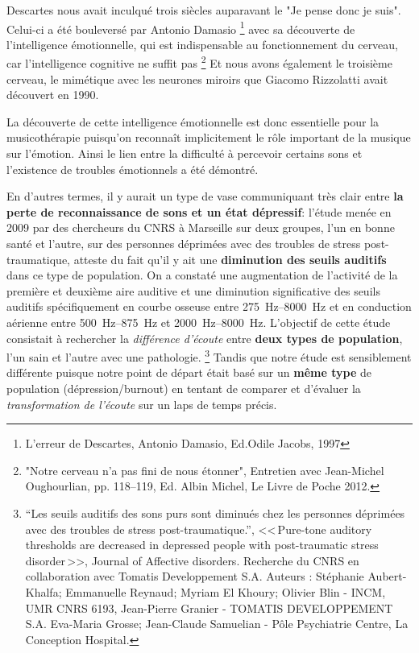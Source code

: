 Descartes nous avait inculqué trois siècles auparavant le "Je pense donc je suis". Celui-ci  a 
été bouleversé par Antonio Damasio \footnote {{L'erreur de Descartes}, Antonio Damasio, 
Ed.Odile Jacobs, 1997} 
avec sa découverte de l'intelligence émotionnelle, qui est indispensable au fonctionnement 
du 
cerveau, car  l'intelligence cognitive ne suffit pas%
\footnote{"Notre cerveau n'a pas fini de nous étonner", Entretien avec Jean-Michel 
     Oughourlian, pp. 118--119, Ed. Albin Michel, Le Livre de Poche 2012.}
Et nous avons  également le troisième cerveau, le mimétique avec les neurones miroirs que Giacomo Rizzolatti avait découvert en 1990.
 
La découverte de cette intelligence  émotionnelle est donc essentielle  pour la 
musicothérapie puisqu'on reconnaît implicitement le rôle important de la musique sur 
l'émotion.   
Ainsi le lien entre la difficulté à percevoir certains sons 
et l'existence 
de troubles émotionnels a été démontré.

En d'autres termes, il y
aurait un type de vase communiquant très clair entre\textbf{ la perte de reconnaissance de sons et
un état dépressif}: l'étude menée en 2009 par des chercheurs du CNRS à Marseille sur deux
groupes, l'un en bonne santé et l'autre,
sur des personnes déprimées avec des troubles de stress post-traumatique, atteste du 
fait qu'il y ait une\textbf{ diminution des seuils auditifs} dans ce type de
population. On a constaté une augmentation de l'activité de la
première et deuxième aire auditive et une diminution significative des
seuils auditifs spécifiquement en courbe osseuse entre
\SIrange{275}{8000}{\Hz} et en conduction aérienne entre
\SIrange{500}{875}{\Hz} et  \SIrange{2000}{8000}{\Hz}.
L'objectif de 
cette étude consistait  à rechercher la\textit{ différence d'écoute} entre
\textbf{deux types de population}, l'un sain et l'autre avec une pathologie. \footnote{``Les seuils auditifs des sons purs 
	sont diminués chez les personnes déprimées avec des
	troubles de stress post-traumatique.'', <<\,Pure-tone auditory 
	thresholds are decreased in depressed people with post-traumatic stress 
disorder\,>>, Journal of Affective disorders. Recherche du CNRS en collaboration
	avec Tomatis Developpement S.A. Auteurs : Stéphanie 
	Aubert-Khalfa; Emmanuelle Reynaud; Myriam El Khoury;
	Olivier Blin - INCM, UMR CNRS 6193, Jean-Pierre Granier -
	TOMATIS DEVELOPPEMENT S.A. Eva-Maria Grosse; Jean-Claude 
	Samuelian - Pôle Psychiatrie Centre, La Conception Hospital.}
Tandis que notre étude est sensiblement différente puisque notre point de départ était basé sur 
un \textbf{même type} de
population (dépression/burnout) en tentant de comparer et d'évaluer
la\textit{ transformation de l'écoute} sur un laps de temps précis.

